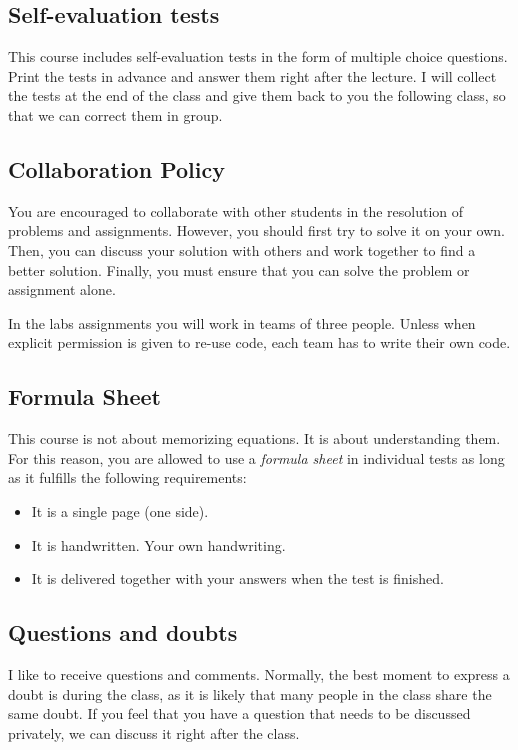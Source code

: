 \subsection{Self-evaluation tests}

This course includes self-evaluation tests in the form of multiple choice questions.
Print the tests in advance and answer them right after the lecture.
I will collect the tests at the end of the class and give them back to you the following class, so that we can correct them in group.

\subsection{Collaboration Policy}
You are encouraged to collaborate with other students in the resolution of problems and assignments.
However, you should first try to solve it on your own.
Then, you can discuss your solution with others and work together to find a better solution.
Finally, you must ensure that you can solve the problem or assignment alone.

In the labs assignments you will work in teams of three people.
Unless when explicit permission is given to re-use code, each team has to write their own code.

\subsection{Formula Sheet}
This course is not about memorizing equations.
It is about understanding them.
For this reason, you are allowed to use a \emph{formula sheet} in individual tests as long as it fulfills the following requirements:
\begin{itemize}
\item It is a single page (one side).
\item It is handwritten. Your own handwriting.
\item It is delivered together with your answers when the test is finished.
\end{itemize}

\subsection{Questions and doubts}
I like to receive questions and comments.
Normally, the best moment to express a doubt is during the class, as it is likely that many people in the class share the same doubt.
If you feel that you have a question that needs to be discussed privately, we can discuss it right after the class.

